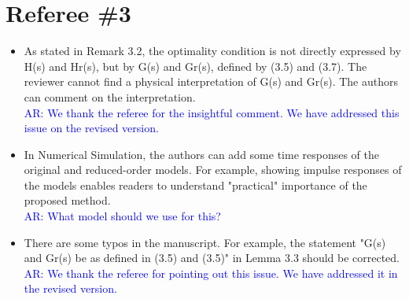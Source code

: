 \documentclass[11pt]{article}
\def\serkan#1{\textcolor{blue}{{#1}}}
\begin{document}
\section*{Referee \#3}

\begin{itemize}
\item As stated in Remark 3.2, the optimality condition is not directly
expressed by H(s) and Hr(s), but by G(s) and Gr(s), defined by (3.5)
and (3.7).  The reviewer cannot find a physical interpretation of G(s)
and Gr(s).  The authors can comment on the interpretation.\\
\serkan{\textsf{AR}:  We thank the referee for the insightful comment. We have addressed this issue on the revised version.}

\item In Numerical Simulation, the authors can add some time responses of
the original and reduced-order models.	For example, showing impulse
responses of the models enables readers to understand "practical"
importance of the proposed method.\\
\serkan{\textsf{AR}:  What model should we use for this?}

\item  There are some typos in the manuscript.  For example, the statement
"G(s) and Gr(s) be as defined in (3.5) and (3.5)" in Lemma 3.3 should
be corrected. \\
\serkan{\textsf{AR}:  We thank the referee for pointing out this issue. We have addressed it in the revised version.}

\end{itemize}
\end{document}
